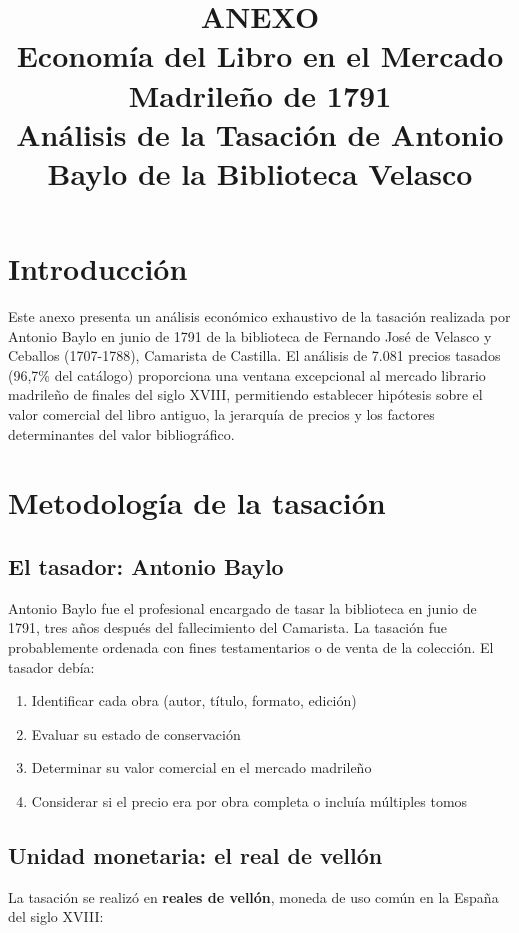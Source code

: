 \documentclass[12pt,a4paper]{article}
\title{\textbf{ANEXO}\\
\Large{Economía del Libro en el Mercado Madrileño de 1791}\\
\large{Análisis de la Tasación de Antonio Baylo de la Biblioteca Velasco}}
\author{}
\date{}
\begin{document}
\maketitle

\section*{Introducción}

Este anexo presenta un análisis económico exhaustivo de la tasación realizada por Antonio Baylo en junio de 1791 de la biblioteca de Fernando José de Velasco y Ceballos (1707-1788), Camarista de Castilla. El análisis de 7.081 precios tasados (96,7\% del catálogo) proporciona una ventana excepcional al mercado librario madrileño de finales del siglo XVIII, permitiendo establecer hipótesis sobre el valor comercial del libro antiguo, la jerarquía de precios y los factores determinantes del valor bibliográfico.

\section{Metodología de la tasación}

\subsection{El tasador: Antonio Baylo}

Antonio Baylo fue el profesional encargado de tasar la biblioteca en junio de 1791, tres años después del fallecimiento del Camarista. La tasación fue probablemente ordenada con fines testamentarios o de venta de la colección. El tasador debía:

\begin{enumerate}
    \item Identificar cada obra (autor, título, formato, edición)
    \item Evaluar su estado de conservación
    \item Determinar su valor comercial en el mercado madrileño
    \item Considerar si el precio era por obra completa o incluía múltiples tomos
\end{enumerate}

\subsection{Unidad monetaria: el real de vellón}

La tasación se realizó en \textbf{reales de vellón}, moneda de uso común en la España del siglo XVIII:
\end{document}
